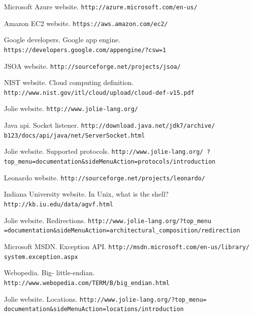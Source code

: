 \documentclass[12pt,a4paper]{article}
\begin{document}
\newpage
\begin{thebibliography}{9}

Microsoft Azure website. \texttt{http://azure.microsoft.com/en-us/}

Amazon EC2 website. \texttt{https://aws.amazon.com/ec2/}

Google developers. Google app engine. \\
\texttt{https://developers.google.com/appengine/?csw=1}

JSOA website. \texttt{http://sourceforge.net/projects/jsoa/}

NIST website. Cloud computing definition. \\ \texttt{http://www.nist.gov/itl/cloud/upload/cloud-def-v15.pdf}

Jolie website. \texttt{http://www.jolie-lang.org/}

Java api. Socket listener. \texttt{http://download.java.net/jdk7/archive/
b123/docs/api/java/net/ServerSocket.html}

Jolie website. Supported protocols. \texttt{http://www.jolie-lang.org/
?top\_menu=documentation\&sideMenuAction=protocols/introduction}

Leonardo website. \texttt{http://sourceforge.net/projects/leonardo/}

Indiana University website. In Unix, what is the shell?\\
\texttt{http://kb.iu.edu/data/agvf.html}

Jolie website. Redirections. \texttt{http://www.jolie-lang.org/?top\_menu
=documentation\&sideMenuAction=architectural\_composition/redirection}

Microsoft MSDN. Exception API. \texttt{http://msdn.microsoft.com/en-us/library/
system.exception.aspx}

Webopedia. Big- little-endian. \texttt{http://www.webopedia.com/TERM/B/big\_endian.html}

Jolie website. Locations. \texttt{http://www.jolie-lang.org/?top\_menu=
documentation\&sideMenuAction=locations/introduction}

\end{thebibliography}
\end{document}
